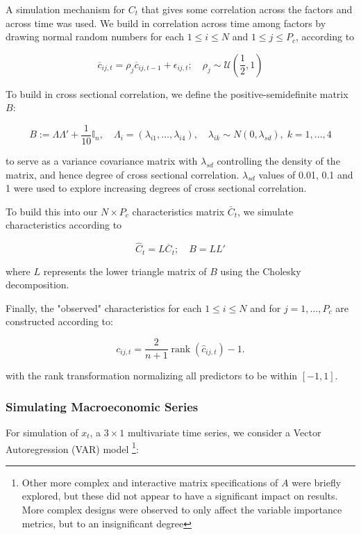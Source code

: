 \documentclass{article}
\begin{document}
A simulation mechanism for $C_t$ that gives some correlation across the factors and across time was used. We build in correlation across time among factors by drawing normal random numbers for each $1\leq i\leq N$ and $1\leq j\leq P_{c}$, according to 

\begin{equation}
\overline{c}_{i j, t} = \rho_{j} \overline{c}_{i j, t-1}+\epsilon_{i j, t} ;
\quad \rho_{j} \sim \mathcal{U} \left( \frac{1}{2},1 \right) 
\end{equation}

To build in cross sectional correlation, we define the positive-semidefinite matrix $B$:

\begin{equation}
B:=\Lambda\Lambda' + \frac{1}{10}\mathbb{I}_{n}, \quad
\Lambda_i = (\lambda_{i1},\dots,\lambda_{i4}), \quad
\lambda_{ik}\sim N(0, \lambda_{sd}), \; k=1, \dots, 4
\end{equation}

to serve as a variance covariance matrix with $\lambda_{sd}$ controlling the density of the matrix, and hence degree of cross sectional correlation. $\lambda_{sd}$ values of 0.01, 0.1 and 1 were used to explore increasing degrees of cross sectional correlation.

To build this into our $N\times P_{c}$ characteristics matrix $\bar{C}_t$, we simulate characteristics according to

\begin{equation}
\widehat{C}_{t}=L\overline{C}_{t} ; \quad B = LL' 
\end{equation}

where $L$ represents the lower triangle matrix of $B$ using the Cholesky decomposition.

Finally, the "observed" characteristics for each $1\leq i\leq N$ and for $j=1, \dots, P_{c}$ are constructed according to:

\begin{equation}
c_{i j, t} = \frac{2}{n+1} \operatorname{rank}\left(\hat{c}_{i j, t}\right) - 1.
\end{equation}

with the rank transformation normalizing all predictors to be within $[-1, 1]$. 

\subsubsection{Simulating Macroeconomic Series}

For simulation of $x_{t}$, a $3 \times 1$ multivariate time series, we consider a Vector Autoregression (VAR) model \footnote{Other more complex and interactive matrix specifications of $A$ were briefly explored, but these did not appear to have a significant impact on results. More complex designs were observed to only affect the variable importance metrics, but to an insignificant degree}:
\end{document}
